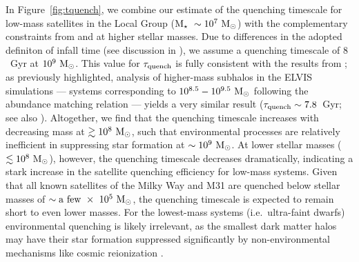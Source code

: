 In Figure~\ref{fig:tquench}, we combine our estimate of the quenching
timescale for low-mass satellites in the Local Group (${\rm M}_{\star}~\sim
10^{7}~{\rm M}_{\odot}$) with the complementary constraints from
\citet{wheeler14} and \citet{wetzel13} at higher stellar masses. Due
to differences in the adopted definiton of infall time (see discussion
in \citealt{wheeler14}), we assume a quenching timescale of $8$~Gyr at
$10^{9}~{\rm M}_{\odot}$. This value for $\tau_{\rm quench}$ is fully consistent
with the results from \citet[][$\tau_{\rm
  quench}\sim7.5-9$~Gyr]{wheeler14}; as previously highlighted,
analysis of higher-mass subhalos in the ELVIS simulations --- systems
corresponding to $10^{8.5}-10^{9.5}~{\rm M}_{\odot}$ following the \citet{gk14}
abundance matching relation --- yields a very similar result
($\tau_{\rm quench}\sim7.8$~Gyr; see also
\citealt{delucia12}). Altogether, we find that the quenching timescale
increases with decreasing mass at $\gtrsim10^{8}~{\rm M}_{\odot}$, such that
environmental processes are relatively inefficient in suppressing star
formation at $\sim10^{9}~{\rm M}_{\odot}$. At lower stellar masses
($\lesssim10^{8}~{\rm M}_{\odot}$), however, the quenching timescale decreases
dramatically, indicating a stark increase in the satellite quenching
efficiency for low-mass systems. Given that all known satellites of
the Milky Way and M31 are quenched below stellar masses of $\sim{\rm
  a~few}~\times~10^{5}~{\rm M}_{\odot}$, the quenching timescale is expected to
remain short to even lower masses.  For the lowest-mass systems
(i.e.~ultra-faint dwarfs) environmental quenching is likely
irrelevant, as the smallest dark matter halos may have their star
formation suppressed significantly by non-environmental mechanisms
like cosmic reionization \citep[e.g.][]{rees86, efstathiou92,
  wyithe06, onorbe15}.





